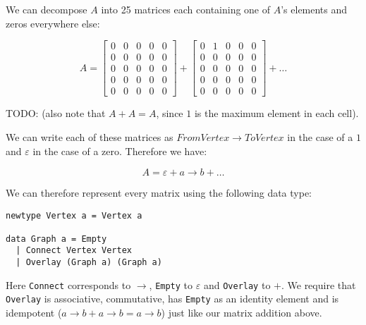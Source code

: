\documentclass[a4paper,twocolumn]{article}
\begin{document}
We can decompose $A$ into 25 matrices each containing one of $A$'s elements and zeros everywhere else:

\[ A=
\begin{bmatrix}
  0 & 0 & 0 & 0 & 0 \\
  0 & 0 & 0 & 0 & 0 \\
  0 & 0 & 0 & 0 & 0 \\
  0 & 0 & 0 & 0 & 0 \\
  0 & 0 & 0 & 0 & 0
\end{bmatrix}
+ 
\begin{bmatrix}
  0 & 1 & 0 & 0 & 0 \\
  0 & 0 & 0 & 0 & 0 \\
  0 & 0 & 0 & 0 & 0 \\
  0 & 0 & 0 & 0 & 0 \\
  0 & 0 & 0 & 0 & 0
\end{bmatrix}
+ \dots
\]

TODO: (also note that $A + A = A$, since $1$ is the maximum element in each cell).

We can write each of these matrices as $FromVertex\xrightarrow{}ToVertex$
in the case of a $1$ and $\varepsilon$ in the case of a zero.
Therefore we have:

\[ A = \varepsilon + a\xrightarrow{}b + \dots \]

We can therefore represent every matrix using the following data type:
\begin{verbatim}
newtype Vertex a = Vertex a

data Graph a = Empty
  | Connect Vertex Vertex
  | Overlay (Graph a) (Graph a)
\end{verbatim}

Here \texttt{Connect} corresponds to $\xrightarrow{}$, \texttt{Empty} to $\varepsilon$ and \texttt{Overlay} to $+$.
We require that \texttt{Overlay} is associative, commutative, has \texttt{Empty} as an identity element
and is idempotent ($a\xrightarrow{}b + a\xrightarrow{}b = a\xrightarrow{}b$) just like our matrix addition above.
\end{document}
